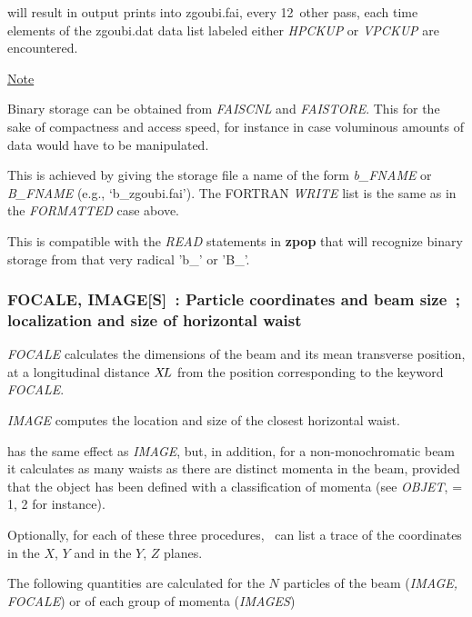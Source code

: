 \noindent will result in output prints into zgoubi.fai, every 12~other 
pass, each time elements of the zgoubi.dat  data list labeled either \textsl{HPCKUP}
or \textsl{VPCKUP} are encountered.

\bigskip

\noindent\underline{Note}

\noindent Binary storage can be obtained from \textsl{FAISCNL} and \textsl{FAISTORE}. This for 
the sake of compactness and access speed, for instance  in case  voluminous amounts of 
data would have to be manipulated. 

This is achieved by giving the storage file a name of the form \textsl{b\_FNAME} 
or \textsl{B\_FNAME}  (e.g., `b\_zgoubi.fai'). The FORTRAN \textsl{WRITE} list 
is the same as in the \textsl{FORMATTED} case above.  

This is compatible with the \textsl{READ} statements in \textbf{zpop} that will recognize binary storage 
from that very radical 'b\_' or 'B\_'. 



\newpage

\subsubsection*{FOCALE, IMAGE[S]~: Particle coordinates and beam size~;  localization and
size  of  horizontal waist}\label{FOCALE}\label{IMAGE}\label{IMAGES}

\textsl{FOCALE}  calculates the dimensions of the beam and its mean 
transverse position, at a longitudinal distance $ X\!L $ from the position 
corresponding to the keyword \textsl{FOCALE}.  
\bigskip

\noindent\textsl{IMAGE}  computes the location and size
of the closest horizontal waist.  
\bigskip

\noindent\IMAGES{}  has the same effect as \textsl{IMAGE},
 but, in addition, for a 
non-monochromatic beam it calculates as many waists as there are distinct momenta in 
the beam, provided that the object has been defined with a classification of momenta 
(see \textsl{OBJET}, \KOBJ = 1, 2  for instance).  
\bigskip

\noindent Optionally, for each of these three procedures, \zgou\ can
list a trace of the coordinates in the $ X$, $Y $ and in the $ Y$, $Z $ planes.  
\bigskip

\noindent The following quantities are calculated for the $ N $ particles of
the beam (\textsl{IMAGE,   FOCALE}) or of each group    of momenta 
(\textsl{IMAGES})  
\bigskip

